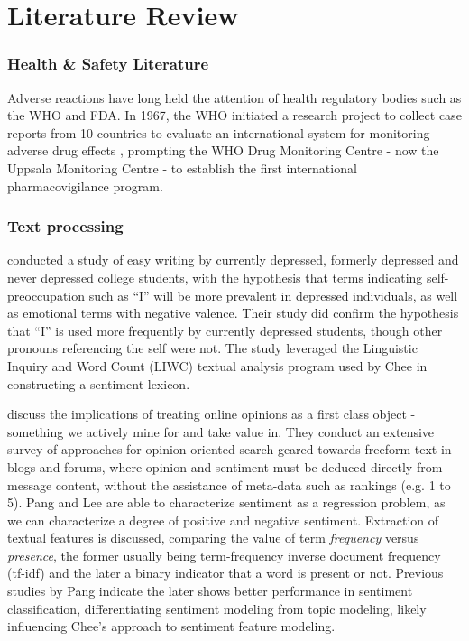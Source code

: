 \documentclass[twoside,11pt]{article}
\begin{document}
\section{Literature Review}

\subsubsection{Health & Safety Literature}
Adverse reactions have long held the attention of health regulatory bodies such as the WHO and FDA. In 1967, the WHO initiated a research project to collect case reports from 10 countries to evaluate an international system for monitoring adverse drug effects \citep{WHO}, prompting the WHO Drug Monitoring Centre - now the Uppsala Monitoring Centre - to establish the first international pharmacovigilance program.

\subsubsection{Text processing}
\citet{Rude} conducted a study of easy writing by currently depressed, formerly depressed and never depressed college students, with the hypothesis that terms indicating self-preoccupation such as ``I'' will be more prevalent in depressed individuals, as well as emotional terms with negative valence. Their study did confirm the hypothesis that ``I'' is used more frequently by currently depressed students, though other pronouns referencing the self were not. The study leveraged the Linguistic Inquiry and Word Count (LIWC) textual analysis program used by Chee in constructing a sentiment lexicon.

\citet{Pang} discuss the implications of treating online opinions as a first class object - something we actively mine for and take value in. They conduct an extensive survey of approaches for opinion-oriented search geared towards freeform text in blogs and forums, where opinion and sentiment must be deduced directly from message content, without the assistance of meta-data such as rankings (e.g.  1 to 5). Pang and Lee are able to characterize sentiment as a regression problem, as we can characterize a degree of positive and negative sentiment. Extraction of textual features is discussed, comparing the value of term \textit{frequency} versus \textit{presence}, the former usually being term-frequency inverse document frequency (tf-idf) and the later a binary indicator that a word is present or not. Previous studies by Pang indicate the later shows better performance in sentiment classification, differentiating sentiment modeling from topic modeling, likely influencing Chee's approach to sentiment feature modeling.
\end{document}
